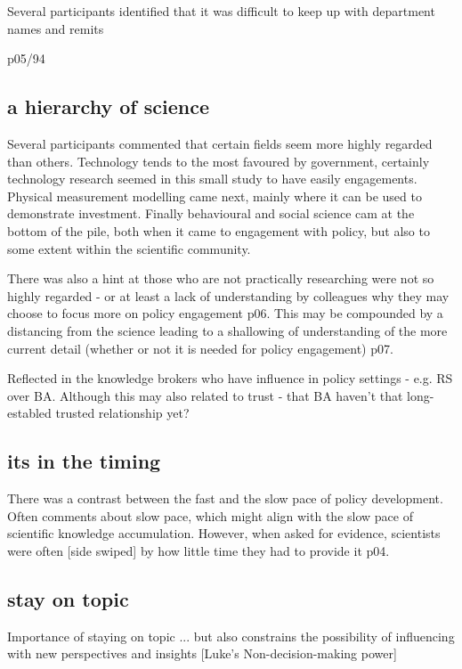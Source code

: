 Several participants identified that it was difficult to keep up with department names and remits 


p05/94

\subsection{a hierarchy of science}
Several participants commented that certain fields seem more highly regarded than others. Technology tends to the most favoured by government, certainly technology research seemed in this small study to have easily engagements. Physical measurement modelling came next, mainly where it can be used to demonstrate investment. Finally behavioural and social science cam at the bottom of the pile, both when it came to engagement with policy, but also to some extent within the scientific community.

There was also a hint at those who are not practically researching were not so highly regarded - or at least a lack of understanding by colleagues why they may choose to focus more on policy engagement p06. This may be compounded by a distancing from the science leading to a shallowing of understanding of the more current detail (whether or not it is needed for policy engagement) p07. 

Reflected in the knowledge brokers who have influence in policy settings - e.g. RS over BA. Although this may also related to trust - that BA haven't that long-establed trusted relationship yet?

\subsection{its in the timing}
There was a contrast between the fast and the slow pace of policy development. Often comments about slow pace, which might align with the slow pace of scientific knowledge accumulation. However, when asked for evidence, scientists were often [side swiped] by how little time they had to provide it p04.  

\subsection{stay on topic}
Importance of staying on topic ... but also constrains the possibility of influencing with new perspectives and insights [Luke's Non-decision-making power]

